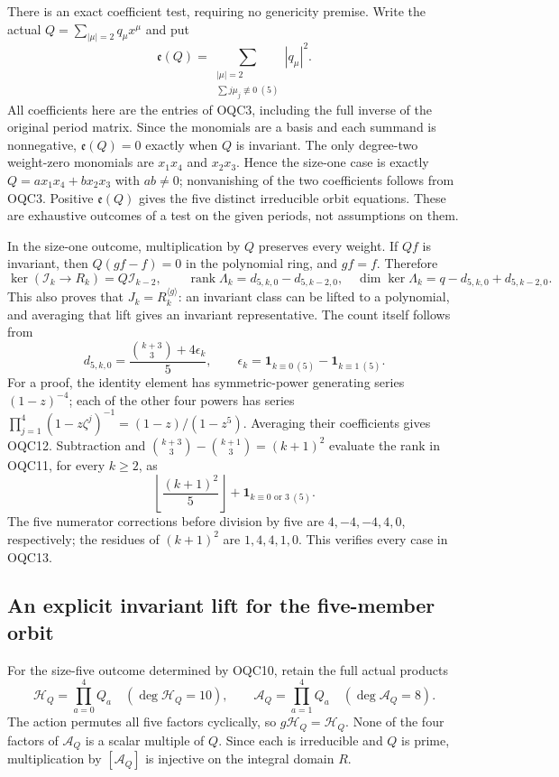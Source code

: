 \documentclass[11pt,a4paper]{article}
\begin{document}
There is an exact coefficient test, requiring no genericity premise.
Write the actual $Q=\sum_{|\mu|=2}q_\mu x^\mu$ and put
\[
 \mathfrak e(Q)=\sum_{\substack{|\mu|=2\\
                      \sum j\mu_j\not\equiv0\ (5)}}|q_\mu|^2.
 \tag{OQC10}
\]
All coefficients here are the entries of OQC3, including the full
inverse of the original period matrix. Since the monomials are a
basis and each summand is nonnegative, $\mathfrak e(Q)=0$ exactly
when $Q$ is invariant. The only degree-two weight-zero monomials
are $x_1x_4$ and $x_2x_3$. Hence the size-one case is exactly
$Q=a x_1x_4+b x_2x_3$ with $ab\ne0$; nonvanishing of the two
coefficients follows from OQC3. Positive $\mathfrak e(Q)$ gives
the five distinct irreducible orbit equations. These are exhaustive
outcomes of a test on the given periods, not assumptions on them.

In the size-one outcome, multiplication by $Q$ preserves every
weight. If $Qf$ is invariant, then $Q(gf-f)=0$ in the polynomial
ring, and $gf=f$. Therefore
\[
 \ker(\mathscr I_k\to R_k)=Q\mathscr I_{k-2},\qquad
 \operatorname{rank}\Lambda_k=d_{5,k,0}-d_{5,k-2,0},
 \quad \dim\ker\Lambda_k=q-d_{5,k,0}+d_{5,k-2,0}.
 \tag{OQC11}
\]
This also proves that $J_k=R_k^{\langle g\rangle}$: an invariant
class can be lifted to a polynomial, and averaging that lift gives
an invariant representative. The count itself follows from
\[
 d_{5,k,0}=\frac{\binom{k+3}{3}+4\epsilon_k}{5},\qquad
 \epsilon_k=\mathbf1_{k\equiv0\ (5)}-\mathbf1_{k\equiv1\ (5)}.
 \tag{OQC12}
\]
For a proof, the identity element has symmetric-power generating
series $(1-z)^{-4}$; each of the other four powers has series
$\prod_{j=1}^4(1-z\zeta^j)^{-1}=(1-z)/(1-z^5)$.
Averaging their coefficients gives OQC12. Subtraction and
$\binom{k+3}{3}-\binom{k+1}{3}=(k+1)^2$ evaluate the rank in
OQC11, for every $k\geq2$, as
\[
 \left\lfloor\frac{(k+1)^2}{5}\right\rfloor
                 +\mathbf1_{k\equiv0\text{ or }3\ (5)}.
 \tag{OQC13}
\]
The five numerator corrections before division by five are
$4,-4,-4,4,0$, respectively; the residues of $(k+1)^2$ are
$1,4,4,1,0$. This verifies every case in OQC13.

\subsection{An explicit invariant lift for the five-member orbit}
For the size-five outcome determined by OQC10, retain the full
actual products
\[
 \mathcal H_Q=\prod_{a=0}^4Q_a\quad(\deg\mathcal H_Q=10),
 \qquad \mathcal A_Q=\prod_{a=1}^4Q_a
                                      \quad(\deg\mathcal A_Q=8).
 \tag{OQC14}
\]
The action permutes all five factors cyclically, so
$g\mathcal H_Q=\mathcal H_Q$. None of the four factors of
$\mathcal A_Q$ is a scalar multiple of $Q$. Since each is
irreducible and $Q$ is prime, multiplication by $[\mathcal A_Q]$
is injective on the integral domain $R$.
\end{document}
